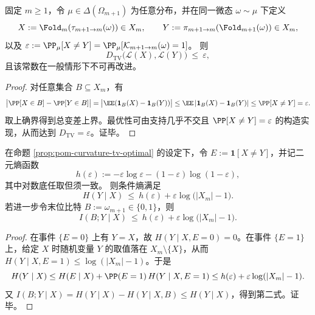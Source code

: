 \begin{proposition}[曲率概率给出的总变差最优上界]\label{prop:pom-curvature-tv-optimal}
固定 $m\ge 1$，令 $\mu\in\Delta(\Omega_{m+1})$ 为任意分布，并在同一微态 $\omega\sim\mu$ 下定义
\[
X:=\Fold_m(\tau_{m+1\to m}(\omega))\in X_m,
\qquad
Y:=\pi_{m+1\to m}(\Fold_{m+1}(\omega))\in X_m,
\]
以及 $\varepsilon:=\PP_\mu[X\neq Y]=\PP_\mu[\mathcal K_{m+1\to m}(\omega)=1]$。
则
\[
D_{\mathrm{TV}}\bigl(\mathcal L(X),\mathcal L(Y)\bigr)\ \le\ \varepsilon,
\]
且该常数在一般情形下不可再改进。
\end{proposition}
\begin{proof}
对任意集合 $B\subseteq X_m$，有
\[
\bigl|\PP[X\in B]-\PP[Y\in B]\bigr|
=\bigl|\EE(\mathbf 1_B(X)-\mathbf 1_B(Y))\bigr|
\le \EE\,|\mathbf 1_B(X)-\mathbf 1_B(Y)|
\le \PP[X\neq Y]=\varepsilon.
\]
取上确界得到总变差上界。最优性可由支持几乎不交且 $\PP[X\neq Y]=\varepsilon$ 的构造实现，从而达到 $D_{\mathrm{TV}}=\varepsilon$。证毕。
\end{proof}

\begin{proposition}[曲率门槛对信息注入的可审计上界]\label{prop:pom-curvature-conditional-entropy-bound}
在命题 \ref{prop:pom-curvature-tv-optimal} 的设定下，令 $E:=\mathbf 1[X\neq Y]$，并记二元熵函数
\[
h(\varepsilon):=-\varepsilon\log\varepsilon-(1-\varepsilon)\log(1-\varepsilon),
\]
其中对数底任取但须一致。
则条件熵满足
\[
H(Y\mid X)\ \le\ h(\varepsilon)+\varepsilon\log\bigl(|X_m|-1\bigr).
\]
若进一步令末位比特 $B:=\omega_{m+1}\in\{0,1\}$，则
\[
I(B;Y\mid X)\ \le\ h(\varepsilon)+\varepsilon\log\bigl(|X_m|-1\bigr).
\]
\end{proposition}
\begin{proof}
在事件 $\{E=0\}$ 上有 $Y=X$，故 $H(Y\mid X,E=0)=0$。在事件 $\{E=1\}$ 上，给定 $X$ 时随机变量 $Y$ 的取值落在 $X_m\setminus\{X\}$，从而 $H(Y\mid X,E=1)\le \log(|X_m|-1)$。于是
\[
H(Y\mid X)\le H(E\mid X)+\PP(E=1)\,H(Y\mid X,E=1)
\le h(\varepsilon)+\varepsilon\log(|X_m|-1).
\]
又 $I(B;Y\mid X)=H(Y\mid X)-H(Y\mid X,B)\le H(Y\mid X)$，得到第二式。证毕。
\end{proof}

